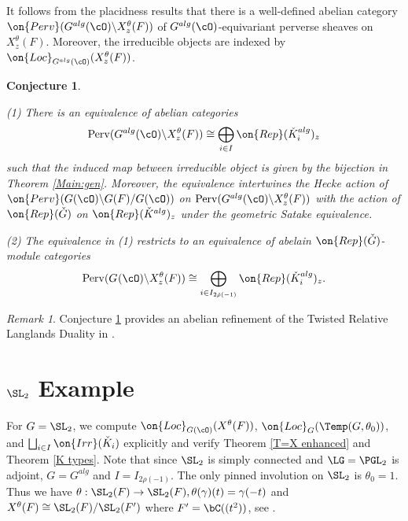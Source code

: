 \documentclass[12pt]{amsart}
\newtheorem{conj}[thm]{Conjecture}
\theoremstyle{remark}
\newtheorem{rem}[thm]{Remark}
\begin{document}
It follows from the placidness results \cite{CY2} that 
there is a well-defined abelian category 
$\on{Perv}(G^{alg}(\cO)\backslash X^\theta_z(F))$ of $G^{alg}(\cO)$-equivariant perverse sheaves on $X^\theta_z(F)$. Moreover, the irreducible objects are indexed by 
$\on{Loc}_{G^{alg}(\cO)}(X^\theta_z(F))$.





\begin{conj}\label{Conjectures}

(1) There is an equivalence of abelian  categories
\[\mathrm{Perv}(G^{alg}(\cO)\backslash X_z
^\theta(F))\cong\bigoplus_{i\in I}\on{Rep}(\check K^{alg}_i)_z\]
such that the induced map between irreducible object is given by the bijection in Theorem \ref{Main:gen}.
Moreover,
the equivalence intertwines the 
Hecke action of 
$\on{Perv}(G(\cO)\backslash G(F)/G(\cO))$ on $\mathrm{Perv}(G^{alg}(\cO)\backslash X_z
^\theta(F))$ with the action of $\on{Rep}(\check G)$
on $\on{Rep}(\check K^{alg})_z$
under the geometric Satake equivalence.

(2) The equivalence in (1)  restricts to an equivalence of abelain 
$\on{Rep}(\check G)$-module categories
\[\mathrm{Perv}(G^{}(\cO)\backslash X_z
^\theta(F))\cong\bigoplus_{i\in I_{2\check\rho(-1)}}\on{Rep}(\check K^{alg}_i)_z.\]
\end{conj}

\begin{rem}
    Conjecture \ref{Conjectures} provides an abelian refinement of 
    the Twisted Relative Langlands Duality 
    in \cite[Conjecture 1.5]{C}. 

\end{rem}








\section{$\SL_2$ Example}
For $G=\SL_2$, we compute
$\on{Loc}_{G(\cO)}(X^\theta(F))$,
$\on{Loc}_G(\Temp(G,\theta_0))$,
and $\bigsqcup_{i\in I}\on{Irr}(\check K_i)$
explicitly
and verify Theorem \ref{T=X enhanced} and Theorem \ref{K types}.
Note that since $\SL_2$ is simply connected
and $\LG=\PGL_2$ is adjoint,
$G=G^{alg}$
and $I=I_{2\rho(-1)}$.
The only pinned involution on $\SL_2$ is $\theta_0=1$.
Thus we have $\theta:\SL_2(F)\to\SL_2(F), \theta(\gamma)(t)=\gamma(-t)$
and $X^\theta(F)\cong \SL_2(F)/\SL_2(F')$
where $F'=\bC((t^2))$, see \cite[Proposition 25]{CY}.
\end{document}
